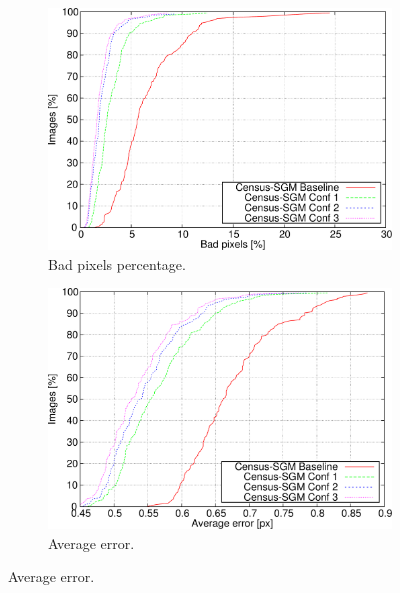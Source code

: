 \begin{figure}[p]
  \centering
  \begin{subfigure}[h]{\textwidth}
    \centering
    \includegraphics[width=\textwidth, height=0.4\textheight, trim=0 0 0 0,clip]{comp_bpp}
    \caption{ Bad pixels percentage. }
    \label{fig:cp03_composite_LGT_bpp}
  \end{subfigure}%
  
  \begin{subfigure}[h]{\textwidth}
    \centering
    \includegraphics[width=\textwidth, height=0.4\textheight, trim=0 0 0 0,clip]{comp_avg}
    \caption{ Average error. }
    \label{fig:cp03_composite_LGT_avg}
  \end{subfigure}%
\end{figure}

